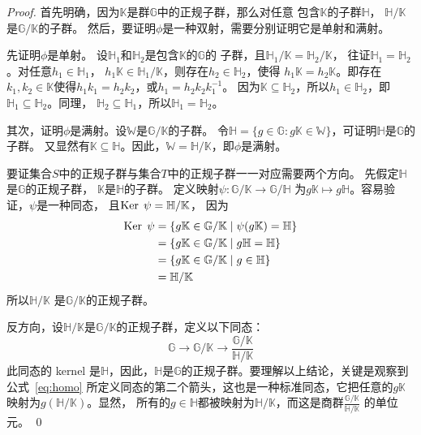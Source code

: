 \begin{proof}
首先明确，因为$\mathbb{K}$是群$\mathbb{G}$中的正规子群，那么对任意
包含$\mathbb{K}$的子群$\mathbb{H}$，
$\mathbb{H}/\mathbb{K}$是$\mathbb{G}/\mathbb{K}$的子群。
然后，要证明$\phi$是一种双射，需要分别证明它是单射和满射。

先证明$\phi$是单射。
设$\mathbb{H}_1$和$\mathbb{H}_2$是包含$\mathbb{K}$的$\mathbb{G}$的
子群，且$\mathbb{H}_1/\mathbb{K} = \mathbb{H}_2/\mathbb{K} $，
往证$\mathbb{H}_1 = \mathbb{H}_2$。对任意$h_1 \in \mathbb{H}_1$，
$h_1 \mathbb{K} \in \mathbb{H}_1/\mathbb{K}$，则存在$h_2 \in \mathbb{H}_2$，使得
$h_1 \mathbb{K} = h_2 \mathbb{K}$。即存在$k_1, k_2 \in \mathbb{K}$使得$h_1 k_1 = h_2 k_2$，或$h_1 = h_2 k_2 k_1^{-1}$。
因为$\mathbb{K} \subseteq \mathbb{H}_2$，所以$h_1 \in \mathbb{H}_2$，即$\mathbb{H}_1 \subseteq \mathbb{H}_2$。同理，
$\mathbb{H}_2 \subseteq \mathbb{H}_1$，所以$\mathbb{H}_1 = \mathbb{H}_2$。

其次，证明$\phi$是满射。设$\mathbb{W}$是$\mathbb{G}/\mathbb{K}$的子群。
令$\mathbb{H} = \{g\in \mathbb{G}: g\mathbb{K} \in \mathbb{W}\}$，可证明$\mathbb{H}$是$\mathbb{G}$的子群。
又显然有$\mathbb{K} \subseteq \mathbb{H}$。因此，$\mathbb{W} = \mathbb{H} / \mathbb{K}$，即$\phi$是满射。

要证集合$S$中的正规子群与集合$T$中的正规子群一一对应需要两个方向。
先假定$\mathbb{H}$是$\mathbb{G}$的正规子群，
$\mathbb{K}$是$\mathbb{H}$的子群。
定义映射$\psi\colon \mathbb{G}/\mathbb{K} \to \mathbb{G}/\mathbb{H}$
为$g\mathbb{K} \mapsto g \mathbb{H}$。容易验证，$\psi$是一种同态，
且$\operatorname{Ker}\; \psi  = \mathbb{H}/\mathbb{K} $，
因为 %
\begin{align*}
\operatorname{Ker}\;\psi
  &= \left\{g\mathbb{K} \in \mathbb{G}/\mathbb{K}
      \;\middle|\; \psi(g\mathbb{K}) = \mathbb{H}\right\} \\
  &= \left\{g\mathbb{K} \in \mathbb{G}/\mathbb{K}
      \;\middle|\; g\mathbb{H} = \mathbb{H}\right\} \\
  &= \left\{g\mathbb{K} \in \mathbb{G}/\mathbb{K}
      \;\middle|\; g \in \mathbb{H}\right\} \\
  &= \mathbb{H}/\mathbb{K}
\end{align*}
所以$\mathbb{H}/\mathbb{K}$
是$\mathbb{G}/\mathbb{K}$的正规子群。

反方向，设$\mathbb{H}/\mathbb{K}$是$\mathbb{G}/\mathbb{K}$的正规子群，定义以下同态：
\begin{equation}\label{eq:homo}
\mathbb{G} \to \mathbb{G} /\mathbb{K} \to \frac{\mathbb{G} /\mathbb{K}}{\mathbb{H} /\mathbb{K}}
\end{equation}
此同态的 kernel 是$\mathbb{H}$，因此，$\mathbb{H}$是$\mathbb{G}$的正规子群。要理解以上结论，关键是观察到公式~\ref{eq:homo}
所定义同态的第二个箭头，这也是一种标准同态，它把任意的$g \mathbb{K} $映射为$g (\mathbb{H} /\mathbb{K})$。显然，
所有的$g \in\mathbb{H}$都被映射为$\mathbb{H} /\mathbb{K}$，而这是商群$\frac{\mathbb{G} /\mathbb{K}}{\mathbb{H} /\mathbb{K}}$
的单位元。
\qed
\end{proof}

